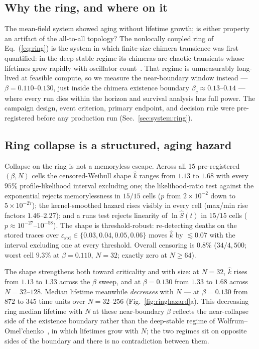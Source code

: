 \documentclass[pdflatex,sn-mathphys,Numbered]{sn-jnl}
\begin{document}
\subsection{Why the ring, and where on it}

The mean-field system showed aging without lifetime growth; is either property an
artifact of the all-to-all topology? The nonlocally coupled ring of
Eq.~(\ref{eq:ring}) is the system in which finite-size chimera transience was
first quantified: in the deep-stable regime its chimeras are chaotic transients
whose lifetimes grow rapidly with oscillator count~\cite{wo2011}. That regime is
unmeasurably long-lived at feasible compute, so we measure the near-boundary
window instead --- $\beta = 0.110$--$0.130$, just inside the chimera existence
boundary $\beta_c \approx 0.13$--$0.14$ --- where every run dies within the
horizon and survival analysis has full power. The campaign design, event
criterion, primary endpoint, and decision rule were pre-registered before any
production run (Sec.~\ref{sec:system:ring}).

\subsection{Ring collapse is a structured, aging hazard}

Collapse on the ring is not a memoryless escape. Across all 15 pre-registered
$(\beta, N)$ cells the censored-Weibull shape $\hat k$ ranges from $1.13$ to
$1.68$ with every $95\%$ profile-likelihood interval excluding one; the
likelihood-ratio test against the exponential rejects memorylessness in $15/15$
cells ($p$ from $2\times10^{-2}$ down to $5\times10^{-27}$); the kernel-smoothed
hazard rises visibly in every cell (max/min rise factors $1.46$--$2.27$); and a
runs test rejects linearity of $\ln \hat S(t)$ in $15/15$ cells
($p \approx 10^{-27}$--$10^{-58}$). The shape is threshold-robust:
re-detecting deaths on the stored traces over
$\varepsilon_{\mathrm{std}} \in \{0.03, 0.04, 0.05, 0.06\}$ moves $\hat k$ by
$\lesssim 0.07$ with the interval excluding one at every threshold. Overall
censoring is $0.8\%$ ($34/4{,}500$; worst cell $9.3\%$ at $\beta = 0.110$,
$N = 32$; exactly zero at $N \ge 64$).

The shape strengthens both toward criticality and with size: at $N = 32$,
$\hat k$ rises from $1.13$ to $1.33$ across the $\beta$ sweep, and at
$\beta = 0.130$ from $1.33$ to $1.68$ across $N = 32$--$128$. Median lifetime
meanwhile \emph{decreases} with $N$ --- at $\beta = 0.130$ from $872$ to $345$
time units over $N = 32$--$256$ (Fig.~\ref{fig:ringhazard}a). This decreasing
ring median lifetime with $N$ at these near-boundary $\beta$ reflects the
near-collapse side of the existence boundary rather than the deep-stable regime
of Wolfrum--Omel'chenko~\cite{wo2011}, in which lifetimes grow with $N$; the two
regimes sit on opposite sides of the boundary and there is no contradiction
between them.
\end{document}
